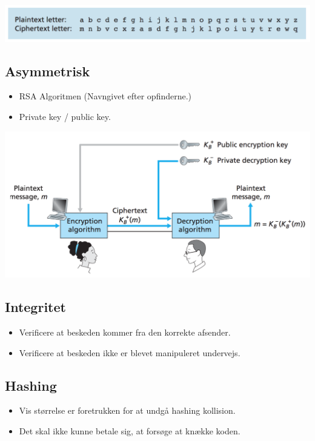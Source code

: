 {\includegraphics[scale=0.7]{8-security-overview/monoalphabetic.png}

\subsection{Asymmetrisk}
\begin{itemize}
	\item RSA Algoritmen (Navngivet efter opfinderne.)
	\item Private key / public key.
\end{itemize}

{\includegraphics[scale=0.7]{8-security-overview/public-key-cryptography.png}


\subsection{Integritet}
\begin{itemize}
	\item Verificere at beskeden kommer fra den korrekte afsender.
	\item Verificere at beskeden ikke er blevet manipuleret undervejs.
\end{itemize}

\subsection{Hashing}
\begin{itemize}
	\item Vis størrelse er foretrukken for at undgå hashing kollision.
	\item Det skal ikke kunne betale sig, at forsøge at knække koden.
\end{itemize}

}}
